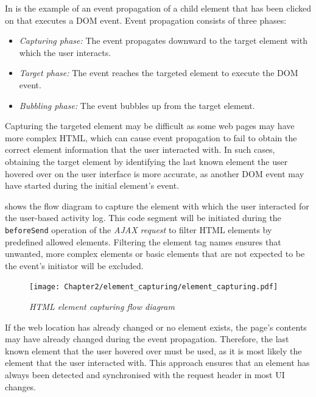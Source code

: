 In  is the example of an event propagation of a child element that has been clicked on that executes a DOM event. Event propagation consists of three phases:

\begin{itemize}
	\item \textit{Capturing phase:} The event propagates downward to the target element with which the user interacts.
	\item \textit{Target phase:} The event reaches the targeted element to execute the DOM event.
	\item \textit{Bubbling phase:} The event bubbles up from the target element.
\end{itemize}

Capturing the targeted element may be difficult as some web pages may have more complex HTML, which can cause event propagation to fail to obtain the correct element information that the user interacted with. In such cases, obtaining the target element by identifying the last known element the user hovered over on the user interface is more accurate, as another DOM event may have started during the initial element's event.\par {} shows the flow diagram to capture the element with which the user interacted for the user-based activity log. This code segment will be initiated during the \texttt{beforeSend} operation of the \textit{AJAX request} to filter HTML elements by predefined allowed elements. Filtering the element tag names ensures that unwanted, more complex elements or basic elements that are not expected to be the event's initiator will be excluded. 

\begin{figure}[!htb]
	\centering %
	\texttt{[image: Chapter2/element\_capturing/element\_capturing.pdf]}
	\caption[HTML element capturing flow diagram]
	{\textit{HTML element capturing flow diagram}}\label{fig:ch3_element_event_capturing}
\end{figure}

If the web location has already changed or no element exists, the page's contents may have already changed during the event propagation. Therefore, the last known element that the user hovered over must be used, as it is most likely the element that the user interacted with. This approach ensures that an element has always been detected and synchronised with the request header in most UI changes.

